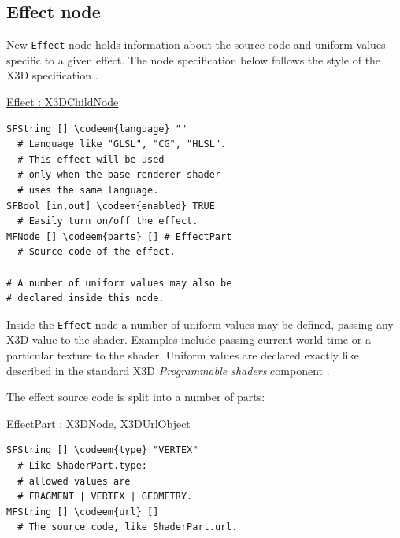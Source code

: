 \documentclass{egpubl}
\newenvironment{mycode}
{\begin{mycodecore}}
{\end{mycodecore}
\vspace{-0.1in}}
\newcommand*{\codeem}[1]{\textbf{#1}}
\begin{document}
\subsection{Effect node}

New \texttt{Effect} node holds information about
the source code and uniform values specific to a given effect.
The node specification below follows the style of
the X3D specification \cite{x3d:spec}.

\begin{mycode}
\underline{Effect : X3DChildNode}
\begin{Verbatim}[commandchars=\\\{\},fontsize=\small]
SFString [] \codeem{language} ""
  # Language like "GLSL", "CG", "HLSL".
  # This effect will be used
  # only when the base renderer shader
  # uses the same language.
SFBool [in,out] \codeem{enabled} TRUE
  # Easily turn on/off the effect.
MFNode [] \codeem{parts} [] # EffectPart
  # Source code of the effect.

# A number of uniform values may also be
# declared inside this node.
\end{Verbatim}
\end{mycode}

Inside the \texttt{Effect} node a number of uniform values may be defined,
passing any X3D value to the shader. Examples include passing
current world time or a particular texture to the shader.
Uniform values are declared exactly like described in the standard
X3D \textit{Programmable shaders} component \cite{x3d:shaders}.



\needspace{1in}
The effect source code is split into a number of parts:

\begin{mycode}
\underline{EffectPart : X3DNode, X3DUrlObject}
\begin{Verbatim}[commandchars=\\\{\},fontsize=\small]
SFString [] \codeem{type} "VERTEX"
  # Like ShaderPart.type:
  # allowed values are
  # FRAGMENT | VERTEX | GEOMETRY.
MFString [] \codeem{url} []
  # The source code, like ShaderPart.url.
\end{Verbatim}
\end{mycode}

\end{document}
